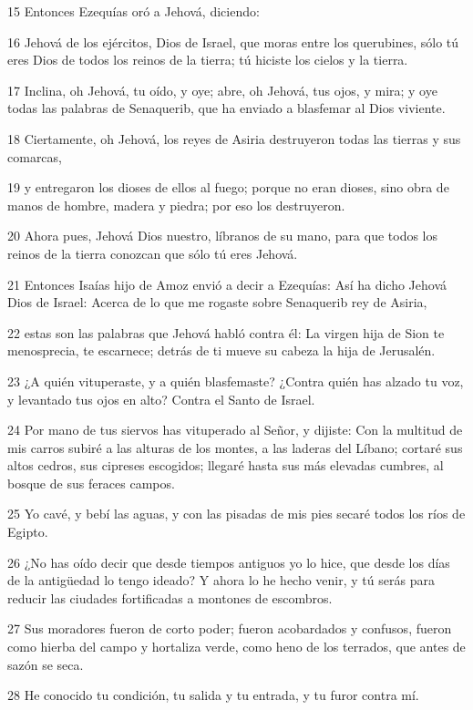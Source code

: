\par 15 Entonces Ezequías oró a Jehová, diciendo:
\par 16 Jehová de los ejércitos, Dios de Israel, que moras entre los querubines, sólo tú eres Dios de todos los reinos de la tierra; tú hiciste los cielos y la tierra.
\par 17 Inclina, oh Jehová, tu oído, y oye; abre, oh Jehová, tus ojos, y mira; y oye todas las palabras de Senaquerib, que ha enviado a blasfemar al Dios viviente.
\par 18 Ciertamente, oh Jehová, los reyes de Asiria destruyeron todas las tierras y sus comarcas,
\par 19 y entregaron los dioses de ellos al fuego; porque no eran dioses, sino obra de manos de hombre, madera y piedra; por eso los destruyeron. 
\par 20 Ahora pues, Jehová Dios nuestro, líbranos de su mano, para que todos los reinos de la tierra conozcan que sólo tú eres Jehová.
\par 21 Entonces Isaías hijo de Amoz envió a decir a Ezequías: Así ha dicho Jehová Dios de Israel: Acerca de lo que me rogaste sobre Senaquerib rey de Asiria,
\par 22 estas son las palabras que Jehová habló contra él: La virgen hija de Sion te menosprecia, te escarnece; detrás de ti mueve su cabeza la hija de Jerusalén.
\par 23 ¿A quién vituperaste, y a quién blasfemaste? ¿Contra quién has alzado tu voz, y levantado tus ojos en alto? Contra el Santo de Israel.
\par 24 Por mano de tus siervos has vituperado al Señor, y dijiste: Con la multitud de mis carros subiré a las alturas de los montes, a las laderas del Líbano; cortaré sus altos cedros, sus cipreses escogidos; llegaré hasta sus más elevadas cumbres, al bosque de sus feraces campos.
\par 25 Yo cavé, y bebí las aguas, y con las pisadas de mis pies secaré todos los ríos de Egipto.
\par 26 ¿No has oído decir que desde tiempos antiguos yo lo hice, que desde los días de la antigüedad lo tengo ideado? Y ahora lo he hecho venir, y tú serás para reducir las ciudades fortificadas a montones de escombros.
\par 27 Sus moradores fueron de corto poder; fueron acobardados y confusos, fueron como hierba del campo y hortaliza verde, como heno de los terrados, que antes de sazón se seca.
\par 28 He conocido tu condición, tu salida y tu entrada, y tu furor contra mí.

